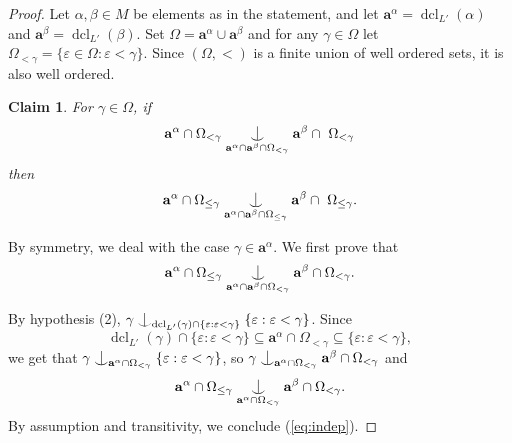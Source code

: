 \documentclass[a4paper]{amsart}
\theoremstyle{plain}
\newtheorem{claim}{Claim}[theorem]
\theoremstyle{definition}
\theoremstyle{remark}
\numberwithin{equation}{section}
\newcommand{\forkindep}[1][]{%
  \mathrel{
    \mathop{
      \vcenter{
        \hbox{\oalign{\noalign{\kern-.3ex}\hfil$\vert$\hfil\cr
              \noalign{\kern-.7ex}
              $\smile$\cr\noalign{\kern-.3ex}}}
      }
    }\displaylimits_{#1}
  }
}
\newenvironment{claimproof}[1][\proofname]
  {%
    \proof[#1]%
      \renewcommand*\qedsymbol{$\square$ (claim)}%
  }
  {%
    \endproof%
  }
\DeclareMathOperator{\dcl}{dcl}
\begin{document}
\begin{proof}
Let $\alpha,\beta\in M$ be elements as in the statement, and let $\mathbf{a}^\alpha=\dcl_{L'}(\alpha)$ and $\mathbf{a}^\beta=\dcl_{L'}(\beta)$.
Set $\Omega=\mathbf{a}^\alpha\cup\mathbf{a}^\beta$ and for any $\gamma\in \Omega$ let $\Omega_{<\gamma}=\{\varepsilon \in \Omega: \varepsilon<\gamma\}$. Since $(\Omega,<)$ is a finite union of well ordered sets, it is also well ordered. 

\begin{claim}\label{C:induction}
For $\gamma\in \Omega$, if \[\mathbf{a}^\alpha\cap \Omega_{<\gamma} \forkindep[\mathbf{a}^\alpha\cap \mathbf{a}^\beta\cap \Omega_{<\gamma}]\mathbf{a}^\beta\cap\ \Omega_{<\gamma}\]
then
\[\mathbf{a}^\alpha\cap \Omega_{\leq \gamma} \forkindep[\mathbf{a}^\alpha\cap \mathbf{a}^\beta\cap \Omega_{\leq \gamma}]\mathbf{a}^\beta\cap\ \Omega_{\leq \gamma}.\]
\end{claim}
\begin{claimproof}
By symmetry, we deal with the case $\gamma\in \mathbf{a}^\alpha$. We first prove that
\begin{equation}\label{eq:indep}
\mathbf{a}^\alpha\cap \Omega_{\leq \gamma}\forkindep[\mathbf{a}^\alpha\cap \mathbf{a}^\beta\cap \Omega_{<\gamma}] \mathbf{a}^\beta\cap \Omega_{<\gamma}.
\end{equation}

By hypothesis (2), $\gamma\forkindep[\dcl_{L'}(\gamma)\cap \{\varepsilon:\varepsilon<\gamma\}]\{\varepsilon:\varepsilon<\gamma\}$.
Since \[\dcl_{L'}(\gamma)\cap\{\varepsilon:\varepsilon<\gamma\}\subseteq \mathbf{a}^\alpha\cap \Omega_{<\gamma}\subseteq \{\varepsilon:\varepsilon<\gamma\},\] we get that $\gamma\forkindep[\mathbf{a}^\alpha\cap \Omega_{<\gamma}]\{\varepsilon:\varepsilon<\gamma\}$, so $\gamma\forkindep[\mathbf{a}^\alpha\cap \Omega_{<\gamma}] \mathbf{a}^\beta\cap \Omega_{<\gamma}$ and \[\mathbf{a}^\alpha\cap\Omega_{\leq \gamma}\forkindep[\mathbf{a}^\alpha\cap \Omega_{<\gamma}] \mathbf{a}^\beta\cap \Omega_{<\gamma}.\] By assumption and transitivity, we conclude (\ref{eq:indep}).


\end{claimproof}
\end{proof}
\end{document}
